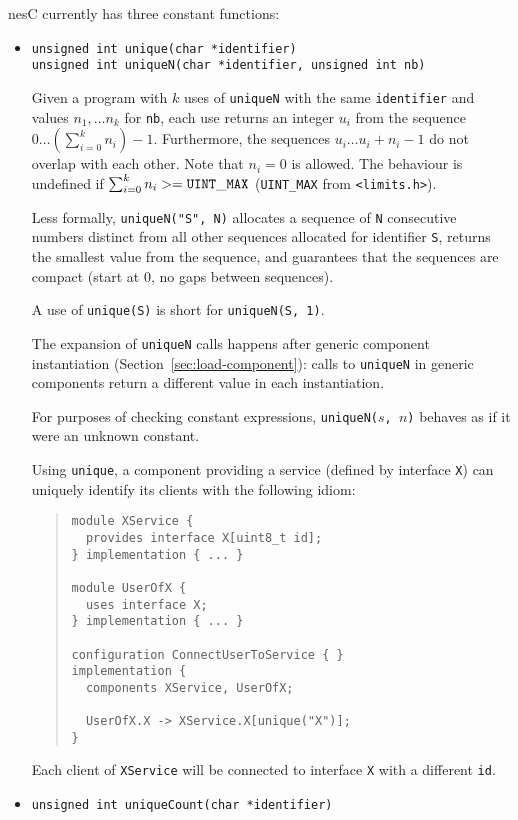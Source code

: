 \documentclass[11pt,letterpaper]{article}
\newcommand{\code}[1]{{\tt #1}}
\newcommand{\nesc}{nesC\xspace}
\begin{document}
\nesc currently has three constant functions:
\begin{itemize}
\item 
\code{unsigned int unique(char *identifier)} \\ 
\code{unsigned int uniqueN(char *identifier, unsigned int nb)}

Given a program with $k$ uses of \code{uniqueN} with the same
\code{identifier} and values $n_1, \ldots n_k$ for \code{nb}, each use
returns an integer $u_i$ from the sequence $0 \ldots (\sum_{i=0}^k
n_i) - 1$. Furthermore, the sequences $u_i \ldots u_i + n_i - 1$ do
not overlap with each other. Note that $n_i = 0$ is allowed. The
behaviour is undefined if $ \sum_{i=0}^k n_i >= \code{UINT\_MAX}$
(\code{UINT\_MAX} from \code{<limits.h>}).


Less formally, \code{uniqueN("S", N)} allocates a sequence of
\code{N} consecutive numbers distinct from all other sequences
allocated for identifier \code{S}, returns the smallest value
from the sequence, and guarantees that the sequences are compact
(start at 0, no gaps between sequences).

A use of \code{unique(S)} is short for \code{uniqueN(S, 1)}.

The expansion of \code{uniqueN} calls happens after generic component
instantiation (Section~\ref{sec:load-component}): calls to \code{uniqueN} in
generic components return a different value in each instantiation.

For purposes of checking constant expressions, \code{uniqueN($s$, $n$)}
behaves as if it were an unknown constant.

Using \code{unique}, a component providing a service (defined by interface
\code{X}) can uniquely identify its clients with the following idiom:
\begin{quote}
\begin{verbatim}
module XService {
  provides interface X[uint8_t id];
} implementation { ... }

module UserOfX {
  uses interface X;
} implementation { ... }

configuration ConnectUserToService { }
implementation {
  components XService, UserOfX;

  UserOfX.X -> XService.X[unique("X")];
}
\end{verbatim}
\end{quote}
Each client of \code{XService} will be connected to interface \code{X} with
a different \code{id}.

\item \code{unsigned int uniqueCount(char *identifier)}


\end{itemize}
\end{document}
